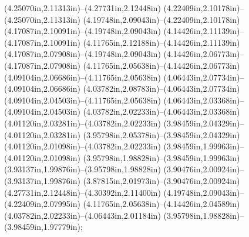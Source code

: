 (4.25070in,2.11313in)--(4.27731in,2.12448in) (4.22409in,2.10178in)--(4.25070in,2.11313in) (4.19748in,2.09043in)--(4.22409in,2.10178in) (4.17087in,2.10091in)--(4.19748in,2.09043in) (4.14426in,2.11139in)--(4.17087in,2.10091in) (4.11765in,2.12188in)--(4.14426in,2.11139in) (4.17087in,2.07908in)--(4.19748in,2.09043in) (4.14426in,2.06773in)--(4.17087in,2.07908in) (4.11765in,2.05638in)--(4.14426in,2.06773in) (4.09104in,2.06686in)--(4.11765in,2.05638in) (4.06443in,2.07734in)--(4.09104in,2.06686in) (4.03782in,2.08783in)--(4.06443in,2.07734in) (4.09104in,2.04503in)--(4.11765in,2.05638in) (4.06443in,2.03368in)--(4.09104in,2.04503in) (4.03782in,2.02233in)--(4.06443in,2.03368in) (4.01120in,2.03281in)--(4.03782in,2.02233in) (3.98459in,2.04329in)--(4.01120in,2.03281in) (3.95798in,2.05378in)--(3.98459in,2.04329in) (4.01120in,2.01098in)--(4.03782in,2.02233in) (3.98459in,1.99963in)--(4.01120in,2.01098in) (3.95798in,1.98828in)--(3.98459in,1.99963in) (3.93137in,1.99876in)--(3.95798in,1.98828in) (3.90476in,2.00924in)--(3.93137in,1.99876in) (3.87815in,2.01973in)--(3.90476in,2.00924in) (4.27731in,2.12448in)--(4.30392in,2.11400in) (4.19748in,2.09043in)--(4.22409in,2.07995in) (4.11765in,2.05638in)--(4.14426in,2.04589in) (4.03782in,2.02233in)--(4.06443in,2.01184in) (3.95798in,1.98828in)--(3.98459in,1.97779in);
